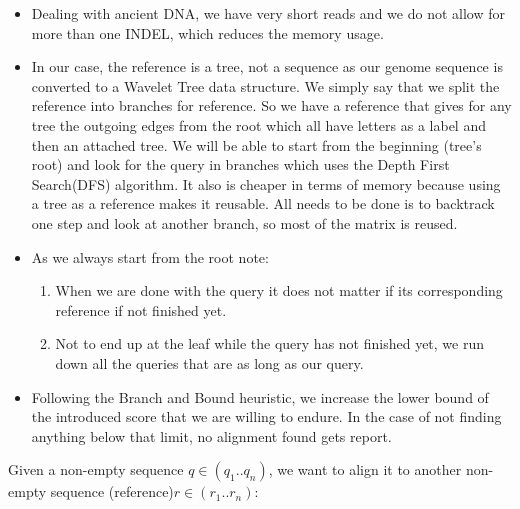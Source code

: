 \documentclass[11pt,a4paper]{report}
\begin{document}
\begin{itemize}

\item Dealing with ancient DNA, we have very short reads and we do not allow for more than one INDEL, which reduces the memory usage.\\

\item 
In our case, the reference is a tree, not a sequence as our genome sequence is converted to 
a Wavelet Tree data structure.
We simply say that we split the reference into branches for reference. So we have a reference that gives for 
any tree the outgoing edges from the root which all have letters  as a label and then an attached tree.
We will be able to start from the beginning (tree's root) and look for the query in branches which uses the Depth First Search(DFS) algorithm. 
It also is cheaper in terms of memory because using a tree as a reference makes it reusable.
All needs to be done is to backtrack one step and look at another branch, so most of the matrix is reused.\\



\item
As we always start from the root note:
\begin{enumerate}
 \item When we are done with the query it does not matter if its corresponding reference if not finished yet.
 
 \item Not to end up at the leaf while the query has not finished yet,
we run down all the queries that are as long as our query.

\end{enumerate}

 \item Following the Branch and Bound heuristic, we increase the lower bound of the introduced score that we are willing to endure. In the case of not finding anything below that limit, no alignment found gets report.
 
\end{itemize}
Given a non-empty sequence $q\in (q_{1}..q_{n})$, we want to align it to 
another non-empty sequence (reference)$r\in (r_{1}..r_{n})$:\\\\
\end{document}
